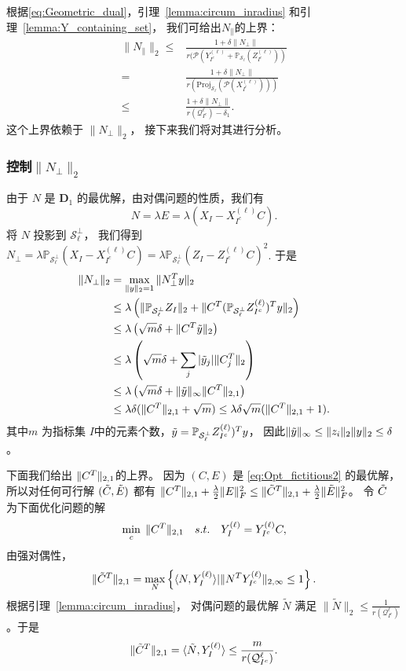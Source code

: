 \documentclass[main.tex]{subfiles}
\begin{document}
根据\eqref{eq:Geometric_dual}，引理~\ref{lemma:circum_inradius} 和引理~\ref{lemma:Y_containing_set}，
我们可给出$N_{\parallel}$的上界：
\begin{align}
  \|N_{\parallel}\|_2 \leq& \frac{1+\delta\|N_{\perp}\|}
  {r(\mathcal{P}(Y_{I^c}^{(\ell)}+\mathbb{P}_{\mathcal{S}_{\ell}}(Z_{I^c}^{(\ell)}))}
  \nonumber \\
  =& \frac{1+\delta\|N_{\perp}\|}{r(\mathrm{Proj}_\mathcal{S_{\ell}}
  (\mathcal{P}(X_{I^c}^{(\ell)})))} \nonumber \\
  \leq& \frac{1+\delta\|N_{\perp}\|}{r{\left( \mathcal{Q}_{I^c}^{\ell}\right)}-\delta_1}.\label{eq:nu1_bound}
\end{align}
这个上界依赖于 $\|N_{\perp}\|_2$， 接下来我们将对其进行分析。


\subsubsection{控制$\|N_{\perp}\|_2$}

由于 $N$ 是 $\mathbf{D}_1$ 的最优解，由对偶问题的性质，我们有
$$ N=\lambda E=\lambda(X_I-X^{(\ell)}_{I^c}C). $$
将 $N$ 投影到 $\mathcal{S}^{\perp}_{\ell}$， 我们得到
$N_{\perp}=\lambda \mathbb{P}_{\mathcal{S}_{\ell}^{\perp}}(X_I-X^{(\ell)}_{I^c}C)
= \lambda \mathbb{P}_{\mathcal{S}_{\ell}^{\perp}}(Z_I-Z^{(\ell)}_{I^c}C)^2$.
于是
\begin{align}
  \|N_{\perp}\|_2 & = \max_{\|y\|_2=1} \|N_{\perp}^T y\|_2 \nonumber \\
  & \leq\lambda \left(\|\mathbb{P}_{\mathcal{S}_{\ell}^{\perp}}Z_I\|_2
  +\|C^T (\mathbb{P}_{\mathcal{S}_{\ell}^{\perp}}Z^{(\ell)}_{I^c})^T y\|_2\right)\nonumber\\
  & \leq \lambda\left( \sqrt{m} \delta + \|C^T \tilde{y}\|_2\right) \nonumber\\
  & \leq \lambda\left( \sqrt{m} \delta + \sum_j |\tilde{y}_j|\|C^T_j\|_2\right) \nonumber\\
  & \leq \lambda\left( \sqrt{m} \delta + \|\tilde{y}\|_{\infty}\|C^T\|_{2,1}\right) \nonumber\\
  & \leq \lambda \delta(\|C^T\|_{2,1}+\sqrt{m}) \leq \lambda\delta\sqrt{m}(\|C^T\|_{2,1}+1). \label{eq:bounding_nu2}
\end{align}
其中$m$ 为指标集 $I$中的元素个数，$\tilde{y}=\mathbb{P}_{\mathcal{S}_{\ell}^{\perp}}Z^{(\ell)}_{I^c})^Ty$，
因此$\|\tilde{y}\|_{\infty} \leq \|z_i\|_2 \|y\|_2 \leq \delta$。

下面我们给出 $\|C^T\|_{2,1}$的上界。
因为 $(C,E)$ 是 \eqref{eq:Opt_fictitious2} 的最优解，所以对任何可行解 $(\tilde{C} ,\tilde{E})$
都有 $\|C^T\|_{2,1}+\frac{\lambda}{2}\|E\|^2_F \leq \|\tilde{C}^T\|_{2,1}+\frac{\lambda}{2}\|\tilde{E}\|_F^2$。
令 $\tilde{C}$ 为下面优化问题的解
\begin{align}\label{eq:Opt_y only}
\min_{c} \; \|C^T\|_{2,1} \quad
s.t. \quad Y^{(\ell)}_I=Y^{(\ell)}_{I^c}C,
\end{align}
由强对偶性，
$$\|\tilde{C}^T\|_{2,1} = \max_{N}\left\{\langle N,Y^{(\ell)}_I\rangle | \|N^T
Y^{(\ell)}_{I^c}\|_{2, \infty}\leq 1\right\}.$$
根据引理~\ref{lemma:circum_inradius}， 对偶问题的最优解 $\tilde{N}$ 满足
$\|\tilde{N}\|_2 \leq \frac{1}{r(\mathcal{Q}_{I^c}^{\ell})}$。于是
$$\|\tilde{C}^T\|_{2,1} = \langle\tilde{N},Y^{(\ell)}_I\rangle \leq \frac{m}{r(\mathcal{Q}_{I^c}^{\ell})}.$$
\end{document}
